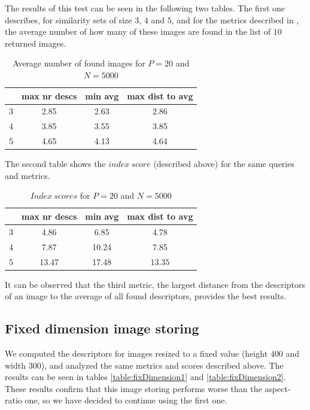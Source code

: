 The results of this test can be seen in the following two tables. The first one describes, for similarity sets of size $3$, $4$ and $5$, and for the metrics described in , the average number of how many of these images are found in the list of $10$ returned images.\\

\begin{table}[H]
\centering
\begin{tabular} {c | c | c | c}
	& max nr descs & min avg & max dist to avg \\
	\hline
	3 & 2.85 & 2.63 & 2.86 \\
	\hline
	4 & 3.85 & 3.55 & 3.85 \\
	\hline
	5 & 4.65 & 4.13 & 4.64 \\
\end{tabular}
\caption{Average number of found images for $P=20$ and $N=5000$}
\end{table}

The second table shows the $index\ score$ (described above) for the same queries and metrics.\\

\begin{table}[H]
\centering
\begin{tabular} {c | c | c | c}
	& max nr descs & min avg & max dist to avg \\
	\hline
	3 & 4.86 & 6.85 & 4.78 \\
	\hline
	4 & 7.87 & 10.24 & 7.85 \\
	\hline
	5 & 13.47 & 17.48 & 13.35 \\
\end{tabular}
\caption{$Index\ scores$ for $P=20$ and $N=5000$}
\end{table}

It can be observed that the third metric, the largest distance from the descriptors of an image to the average of all found descriptors, provides the best results.\\

\subsection{Fixed dimension image storing}
	We computed the descriptors for images resized to a fixed value (height $400$ and width $300$), and analyzed the same metrics and scores described above. The results can be seen in tables
\ref{table:fixDimension1} and \ref{table:fixDimension2}. These results confirm that this image storing
performs worse than the aspect-ratio one, so we have decided to continue using the first one.\\
	 
